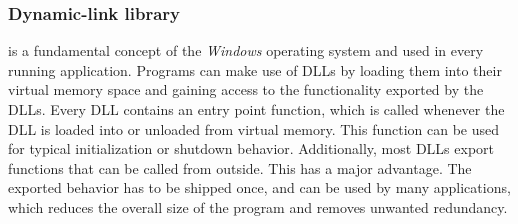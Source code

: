\subsubsection{Dynamic-link library}
 is a fundamental concept of the \emph{Windows} operating system and used in every running application. Programs can make use of \glspl{DLL} by loading them into their virtual memory space and gaining access to the functionality exported by the \glspl{DLL}. Every \gls{DLL} contains an entry point function, which is called whenever the \gls{DLL} is loaded into or unloaded from virtual memory. This function can be used for typical initialization or shutdown behavior. Additionally, most \glspl{DLL} export functions that can be called from outside. This has a major advantage. The exported behavior has to be shipped once, and can be used by many applications, which reduces the overall size of the program and removes unwanted redundancy.